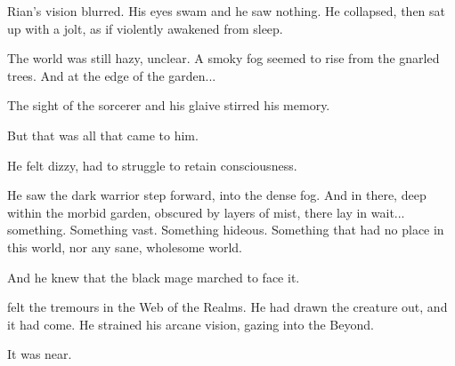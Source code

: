 \begin{comment}
\subsubsection{Rian}
\end{comment}
\new
Rian's vision blurred. His eyes swam and he saw nothing. 
He collapsed, then sat up with a jolt, as if violently awakened from sleep. 


The world was still hazy, unclear. A smoky fog seemed to rise from the gnarled trees. And at the edge of the garden... 

The sight of the sorcerer and his glaive stirred his memory. 


But that was all that came to him. 

He felt dizzy, had to struggle to retain consciousness. 

He saw the dark warrior step forward, into the dense fog. And in there, deep within the morbid garden, obscured by layers of mist, there lay in wait... something. Something vast. Something hideous. Something that had no place in this world, nor any sane, wholesome world. 

And he knew that the black mage marched to face it. 







\begin{comment}
\subsubsection{\Ishnaruchaefir}
\end{comment}
\new
\QuessanthIshnaruchaefir{} felt the tremours in the Web of the Realms. He had drawn the creature out, and it had come. He strained his arcane vision, gazing into the Beyond. 

It was near. 

